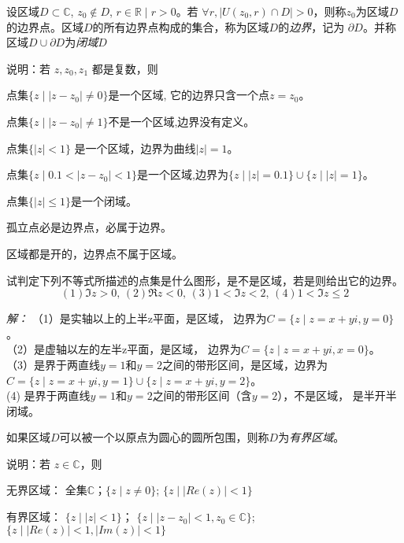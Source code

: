 \begin{definition}\label{}\index{}
	设区域$D \subset \mathbb{C}$, $z_0 \notin D $, $  r  \in \mathbb{R} \mid  r  > 0 $。若 $ \forall  r , |U(z_0,  r )\cap D|> 0 $，则称$z_0$为区域$D$的边界点。区域$D$的所有边界点构成的集合，称为区域$D$的\emph{边界}，记为 $\partial  D$。并称区域$D \cup \partial  D$为\emph{闭域}$D$ 
\end{definition}
说明：若 $z, z_0, z_1$ 都是复数，则
\begin{compactitem}
    \item 点集$\{z  \mid |z- z_0| \ne 0 \}$是一个区域, 它的边界只含一个点$z = z_0$。
    \item 点集$\{z  \mid |z - z_0| \ne 1 \}$不是一个区域,边界没有定义。
    \item 点集$\{|z| < 1 \}$ 是一个区域，边界为曲线$|z|=1$。
    \item 点集$\{z  \mid 0.1 <|z - z_0| < 1 \}$是一个区域,边界为$\{z  \mid |z| =0.1\} \cup \{z  \mid |z| =1\} $。
    \item 点集$\{|z| \le 1 \}$是一个闭域。
    \item 孤立点必是边界点，必属于边界。
    \item 区域都是开的，边界点不属于区域。
\end{compactitem}

\begin{example}
    试判定下列不等式所描述的点集是什么图形，是不是区域，若是则给出它的边界。 
    \[ (1) \Im z >0,\, (2) \Re z <0,\, (3) 1 < \Im z < 2,\, (4) 1 < \Im z \le 2\]
\end{example}
\emph{解：} （1）是实轴以上的上半z平面，是区域， 边界为$C = \{ z \mid z = x+yi, y =0\}$。\\
（2）是虚轴以左的左半z平面，是区域， 边界为$C = \{ z \mid z = x+yi, x =0\}$。\\ 
（3）是界于两直线$y=1$和$y=2$之间的带形区间，是区域，边界为$C = \{ z \mid z = x+yi, y =1\} \cup \{ z \mid z = x+yi, y =2\}$。\\
(4) 是界于两直线$y=1$和$y=2$之间的带形区间（含$y=2$），不是区域， 是半开半闭域。

\begin{definition}\label{}\index{}
	如果区域$D$可以被一个以原点为圆心的圆所包围，则称$D$为\emph{有界区域}。
\end{definition}
说明：若 $z \in \mathbb{C}$，则
\begin{compactitem}
    \item  无界区域： 全集$\mathbb{C}$；$\{z \mid z \ne 0 \}$; $\{z \mid  |Re (z)| < 1 \}$
    \item  有界区域： $\{z \mid |z| < 1 \}$； $\{z \mid |z - z_0| < 1, z_0 \in  \mathbb{C} \}$; $\{z \mid  |Re (z)| < 1,  |Im (z)| < 1 \}$
\end{compactitem}  

